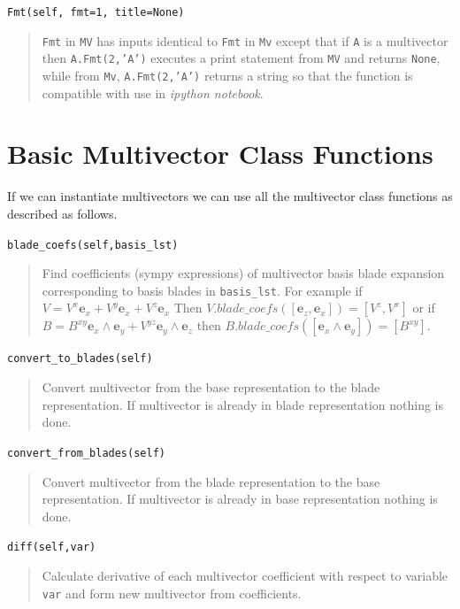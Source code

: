 \documentclass[12pt]{report}
\newcommand{\bm}[1]{\boldsymbol{#1}}
\newcommand{\W}{\wedge}
\newcommand{\eb}{\bm{e}}
\newcommand{\T}[1]{\texttt{#1}}
\begin{document}
\T{Fmt(self, fmt=1, title=None)}

\begin{quote}
    \T{Fmt} in \T{MV} has inputs identical to \T{Fmt} in \T{Mv} except that if \T{A} is a multivector then \T{A.Fmt(2,'A')}
    executes a print statement from \T{MV} and returns \T{None}, while from \T{Mv}, \T{A.Fmt(2,'A')} returns a string so that
    the function is compatible with use in \emph{ipython notebook}.
\end{quote}


\section{Basic Multivector Class Functions}

If we can instantiate multivectors we can use all the multivector class functions as described as follows.

\T{blade\_coefs(self,basis\_lst)}
\begin{quote}
   Find coefficients (sympy expressions) of multivector basis blade expansion corresponding to basis 
   blades in \T{basis\_lst}. For example if $V = V^{x}\eb_{x}+V^{y}\eb_{x}+V^{z}\eb_{x}$ Then
   $V.blade\_coefs([\eb_{z},\eb_{x}]) = [V^{z},V^{x}]$ or if $B = B^{xy}\eb_{x}\W\eb_{y}+V^{yz}\eb_{y}\W\eb_{z}$
   then $B.blade\_coefs([\eb_{x}\W\eb_{y}]) = [B^{xy}]$.
\end{quote}

\T{convert\_to\_blades(self)}
\begin{quote}
   Convert multivector from the base representation to the blade representation.
   If multivector is already in blade representation nothing is done.
\end{quote}

\T{convert\_from\_blades(self)}
\begin{quote}
   Convert multivector from the blade representation to the base representation.
   If multivector is already in base representation nothing is done.
\end{quote}

\T{diff(self,var)}
\begin{quote}
   Calculate derivative of each multivector coefficient with respect to
   variable \T{var} and form new multivector from coefficients.
\end{quote}
\end{document}
